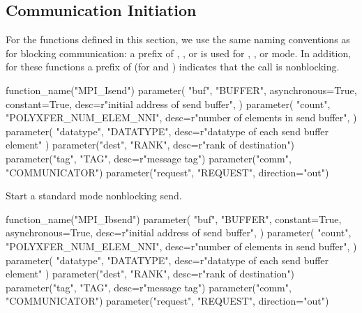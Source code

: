 \subsection{Communication Initiation}
\label{subsec:pt2pt-commstart}

For the functions defined in this section, we use the same naming conventions as for blocking communication: a
prefix of , , or  is used for
,
, or
 mode.
In addition, for these functions a prefix of  (for  and ) indicates
that the call is nonblocking.

\begin{mpi-binding}
    function_name("MPI_Isend")
    parameter(
        "buf",
        "BUFFER",
        asynchronous=True,
        constant=True,
        desc=r"initial address of send buffer",
    )
    parameter(
        "count",
        "POLYXFER_NUM_ELEM_NNI",
        desc=r"number of elements in send buffer",
    )
    parameter(
        "datatype", "DATATYPE", desc=r"datatype of each send buffer element"
    )
    parameter("dest", "RANK", desc=r"rank of destination")
    parameter("tag", "TAG", desc=r"message tag")
    parameter("comm", "COMMUNICATOR")
    parameter("request", "REQUEST", direction="out")
\end{mpi-binding}


Start a standard mode nonblocking send.


\begin{mpi-binding}
    function_name("MPI_Ibsend")
    parameter(
        "buf",
        "BUFFER",
        constant=True,
        asynchronous=True,
        desc=r"initial address of send buffer",
    )
    parameter(
        "count",
        "POLYXFER_NUM_ELEM_NNI",
        desc=r"number of elements in send buffer",
    )
    parameter(
        "datatype", "DATATYPE", desc=r"datatype of each send buffer element"
    )
    parameter("dest", "RANK", desc=r"rank of destination")
    parameter("tag", "TAG", desc=r"message tag")
    parameter("comm", "COMMUNICATOR")
    parameter("request", "REQUEST", direction="out")
\end{mpi-binding}

